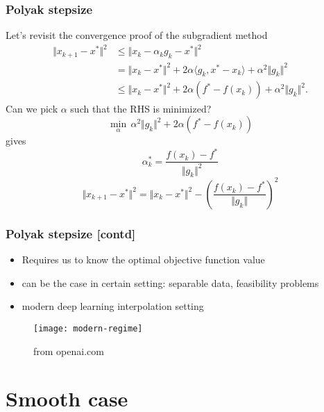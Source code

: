 \documentclass{beamer}
\begin{document}
\begin{frame}
  \frametitle{Polyak stepsize}
  Let's revisit the convergence proof of the subgradient method
  \begin{equation}
    \begin{aligned}
      \Vert x_{k+1} - x^* \Vert^2 &\le \Vert x_k - \alpha_k g_k - x^* \Vert^2 \\
      &= \Vert x_k-x^* \Vert^2 + 2 \alpha \langle g_k, x^*-x_k \rangle + \alpha^2 \Vert g_k \Vert^2\\
      &\le \Vert x_k-x^* \Vert^2 + 2 \alpha (f^* - f(x_k))+ \alpha^2 \Vert g_k \Vert^2.
    \end{aligned}
  \end{equation}
  Can we pick $\alpha$ such that the RHS is minimized?
  \begin{equation}
    \min_\alpha \, \alpha^2 \Vert g_k \Vert^2 + 2 \alpha (f^* - f(x_k))
  \end{equation}
  gives
  \begin{equation}
    \alpha_k^* = \frac{f(x_k)-f^*}{\Vert g_k \Vert^2}
  \end{equation}
  \begin{equation}
      \Vert x_{k+1} - x^* \Vert^2 = \Vert x_k-x^* \Vert^2 - {\left( \frac{f(x_k)-f^*}{\Vert g_k \Vert} \right)}^2
  \end{equation}
\end{frame}

\begin{frame}
  \frametitle{Polyak stepsize [contd]}
  \begin{itemize}
    \item Requires us to know the optimal objective function value
    \item can be the case in certain setting:
          separable data, feasibility problems
    \item modern deep learning interpolation setting
  \end{itemize}
  \begin{figure}[ht]
    \centering
    \texttt{[image: modern-regime]}
    \caption{from openai.com}
  \end{figure}
\end{frame}


\section{Smooth case}%
\label{sec:}
\end{document}
